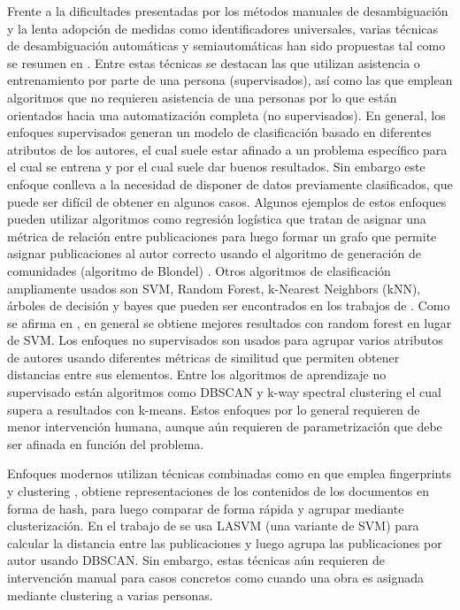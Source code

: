 \documentclass[conference]{IEEEtran}
\begin{document}
Frente a la dificultades presentadas por los métodos manuales de desambiguación y la lenta adopción de medidas como identificadores universales, varias técnicas de desambiguación automáticas y semiautomáticas  han sido propuestas tal como se resumen en \cite{journals/sigmod/FerreiraGL12}\cite{Smalheiser:2009:AND:1951529.1951542}. Entre estas técnicas se destacan las que utilizan asistencia o entrenamiento  por parte de una persona (supervisados), así como las que emplean algoritmos que no requieren asistencia de una personas por lo que están orientados hacia una automatización completa (no supervisados). En general, los enfoques supervisados generan un modelo de clasificación  basado en diferentes atributos de los autores, el cual suele estar afinado a un problema específico para el cual se entrena y por el cual suele dar buenos resultados. Sin embargo este enfoque conlleva a la necesidad de disponer de datos previamente clasificados, que puede ser difícil de obtener en algunos casos. Algunos ejemplos de estos enfoques pueden utilizar algoritmos como  regresión logística que tratan de asignar una métrica de relación entre publicaciones para luego formar un grafo que permite asignar publicaciones al autor correcto usando el algoritmo de generación de comunidades (algoritmo de Blondel) \cite{gurney2012author}. Otros algoritmos de clasificación ampliamente usados son SVM, Random Forest, k-Nearest Neighbors (kNN), árboles de decisión y bayes que pueden ser encontrados en los trabajos de \cite{treeratpituk2009disambiguating}\cite{huynh2013vietnamese}\cite{yang2008author}\cite{han2005hierarchical}. Como se afirma en \cite{treeratpituk2009disambiguating}, en  general se obtiene mejores resultados con random forest en lugar de SVM. Los enfoques no supervisados son usados para agrupar varios atributos de autores usando diferentes métricas de similitud que permiten obtener distancias entre sus elementos. Entre los algoritmos de aprendizaje no supervisado están algoritmos como DBSCAN\cite{huang2006efficient} y k-way spectral clustering \cite{giles2005name} el cual supera a resultados con k-means. Estos enfoques por lo general requieren de menor intervención humana, aunque aún requieren de parametrización que debe ser afinada en función del problema.

Enfoques  modernos utilizan técnicas combinadas como en \cite{hansemantic} que emplea  fingerprints y clustering , obtiene representaciones de los contenidos de los documentos en forma de hash, para luego comparar de forma rápida y agrupar mediante clusterización. En el trabajo de \cite{huang2006efficient} se usa LASVM (una variante de SVM) para calcular la distancia entre las publicaciones y luego agrupa las publicaciones por autor usando DBSCAN. Sin embargo, estas técnicas aún requieren de intervención manual para casos concretos como cuando una obra es asignada mediante clustering a varias personas.
\end{document}
